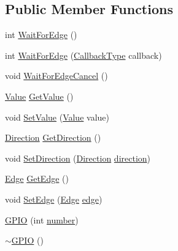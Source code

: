 \subsection*{Public Member Functions}
\begin{DoxyCompactItemize}
\item 
int \hyperlink{class_hardware_1_1_g_p_i_o_afd1340f1a1907168e7dc4ad24027b96a}{Wait\+For\+Edge} ()
\item 
int \hyperlink{class_hardware_1_1_g_p_i_o_a68cce8d2f123100a2806b32958f6b719}{Wait\+For\+Edge} (\hyperlink{namespace_hardware_a5ba2e4bdfa2bbd8b551b1d5b2a0c61fd}{Callback\+Type} callback)
\item 
void \hyperlink{class_hardware_1_1_g_p_i_o_a9b16b6ac156b20d979e92244d0b05c63}{Wait\+For\+Edge\+Cancel} ()
\item 
\hyperlink{class_hardware_1_1_g_p_i_o_ad357201dc1ad13ad96ba1773108a5f6d}{Value} \hyperlink{class_hardware_1_1_g_p_i_o_a7bb00a19893d4cc5432d81fc306223ac}{Get\+Value} ()
\item 
void \hyperlink{class_hardware_1_1_g_p_i_o_a2564893797de6a2dab596c4fc990b919}{Set\+Value} (\hyperlink{class_hardware_1_1_g_p_i_o_ad357201dc1ad13ad96ba1773108a5f6d}{Value} value)
\item 
\hyperlink{class_hardware_1_1_g_p_i_o_a7507431d6341c146f22dcdb21b78ffd4}{Direction} \hyperlink{class_hardware_1_1_g_p_i_o_a410f58faf97368fc9a1d76f3b44afbcb}{Get\+Direction} ()
\item 
void \hyperlink{class_hardware_1_1_g_p_i_o_a4a9fc2f7be304a6b23c2a2876b4c6bf9}{Set\+Direction} (\hyperlink{class_hardware_1_1_g_p_i_o_a7507431d6341c146f22dcdb21b78ffd4}{Direction} \hyperlink{class_hardware_1_1_g_p_i_o_a77e93e4f6650507fdc4898d272d540e7}{direction})
\item 
\hyperlink{class_hardware_1_1_g_p_i_o_a9a7595aabdac9aec75f22e8b86342162}{Edge} \hyperlink{class_hardware_1_1_g_p_i_o_a081393bd50e4b1a7830764e0772c4cba}{Get\+Edge} ()
\item 
void \hyperlink{class_hardware_1_1_g_p_i_o_a4d4ab3b0f1ee53590a300bfbcccae895}{Set\+Edge} (\hyperlink{class_hardware_1_1_g_p_i_o_a9a7595aabdac9aec75f22e8b86342162}{Edge} \hyperlink{class_hardware_1_1_g_p_i_o_adf15f74f053069029e99934e28c109e0}{edge})
\item 
\hyperlink{class_hardware_1_1_g_p_i_o_afa29c38f1b07c2db68572ac0c60ed787}{G\+P\+I\+O} (int \hyperlink{class_hardware_1_1_g_p_i_o_a1671a87bb70911b0a6a29019a068cf96}{number})
\item 
\hyperlink{class_hardware_1_1_g_p_i_o_a4a32391de40411d1aa5c49206cacc06d}{$\sim$\+G\+P\+I\+O} ()
\end{DoxyCompactItemize}
